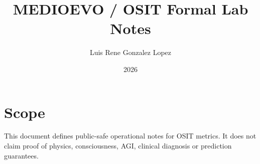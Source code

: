 \documentclass{article}
\title{MEDIOEVO / OSIT Formal Lab Notes}
\author{Luis Rene Gonzalez Lopez}
\date{2026}
\begin{document}
\maketitle

\section{Scope}

This document defines public-safe operational notes for OSIT metrics. It does not claim proof of physics, consciousness, AGI, clinical diagnosis or prediction guarantees.




\end{document}

